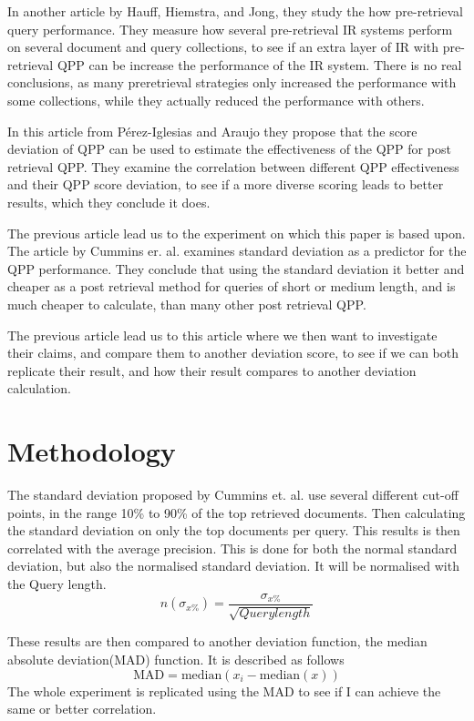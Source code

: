 \documentclass{sig-alternate}
\begin{document}
In another article by Hauff, Hiemstra, and Jong\cite{review3}, they study the how pre-retrieval query performance. They measure how several pre-retrieval IR systems perform on several document and query collections, to see if an extra layer of IR with pre-retrieval QPP can be increase the performance of the IR system. There is no real conclusions, as many preretrieval strategies only increased the performance with some collections, while they actually reduced the performance with others. 

In this article from Pérez-Iglesias and Araujo\cite{review2} they propose that the score deviation of QPP can be used to estimate the effectiveness of the QPP for post retrieval QPP. They examine the correlation between different QPP effectiveness and their QPP score deviation, to see if a more diverse scoring leads to better results, which they conclude it does.

The previous article lead us to the experiment on which this paper is based upon. The article by Cummins er. al. \cite{cummins2011improved} examines standard deviation as a predictor for the QPP performance. They conclude that using the standard deviation it better and cheaper as a post retrieval method for queries of short or medium length, and is much cheaper to calculate, than many other post retrieval QPP.

The previous article lead us to this article where we then want to investigate their claims, and compare them to another deviation score, to see if we can both replicate their result, and how their result compares to another deviation calculation.

\section{Methodology}
The standard deviation proposed by Cummins et. al. use several different cut-off points, in the range 10\% to 90\% of the top retrieved documents. Then calculating the standard deviation on only the top documents per query. This results is then correlated with the average precision. This is done for both the normal standard deviation, but also the normalised standard deviation. It will be normalised with the Query length.$$
n(\sigma_{x\%})=\frac{\sigma_{x\%}}{\sqrt{Querylength}}
$$

These results are then compared to another deviation function, the median absolute deviation(MAD) function. It is described as follows
\begin{equation}
\text{MAD} = \text{median}\left(x_i - \text{median}(x)\right)
\end{equation}
The whole experiment is replicated using the MAD to see if I can achieve the same or better correlation.
\end{document}
